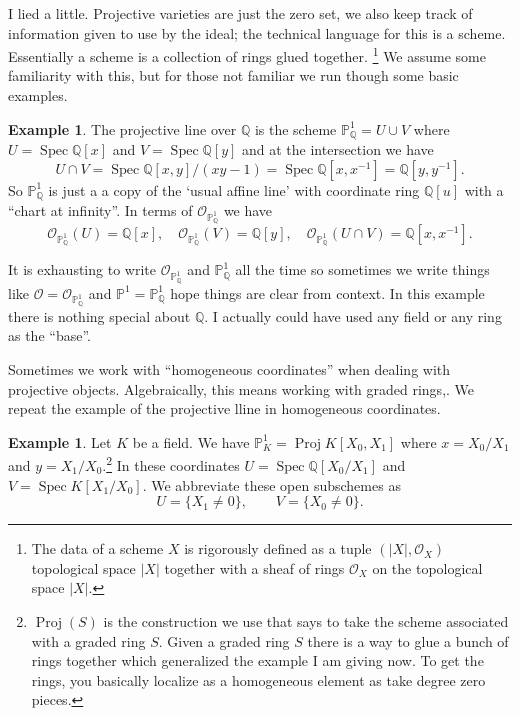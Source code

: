 \documentclass[12pt]{article}
\numberwithin{equation}{section}
\theoremstyle{definition}
\newtheorem{example}[theorem]{Example}
\theoremstyle{remark}
\newcommand{\QQ}{\mathbb{Q}}
\newcommand{\Ocal}{\mathcal{O}}
\newcommand{\PP}{\mathbb{P}}
\newcommand{\Spec}{\operatorname{Spec}}
\newcommand{\Proj}{\operatorname{Proj}}
\begin{document}
I lied a little. Projective varieties are just the zero set, we also keep track of information given to use by the ideal; the technical language for this is a scheme. 
Essentially a scheme is a collection of rings glued together.
\footnote{The data of a scheme $X$ is rigorously defined as a tuple $(\vert X \vert, \Ocal_X)$ topological space $\vert X\vert$ together with a sheaf of rings $\Ocal_X$ on the topological space $\vert X \vert$.}
We assume some familiarity with this, but for those not familiar we run though some basic examples.

\begin{example}
	The projective line over $\QQ$ is the scheme
	$\PP^1_{\QQ}=U \cup V$ where $U = \Spec \QQ[x]$ and $V = \Spec \QQ[y]$ and at the intersection we have 
	$$ U\cap V = \Spec \QQ[x,y]/(xy-1) = \Spec \QQ[x,x^{-1}] = \QQ[y,y^{-1}].$$
	So $\PP^1_{\QQ}$ is just a a copy of the `usual affine line' with coordinate ring $\QQ[u]$
	with a ``chart at infinity''.
	In terms of $\Ocal_{\PP^1_{\QQ}}$ we have 
	$$\Ocal_{\PP^1_{\QQ}}(U) =\QQ[x], \quad \Ocal_{\PP^1_{\QQ}}(V) = \QQ[y], \quad \Ocal_{\PP^1_{\QQ}}(U\cap V) = \QQ[x,x^{-1}].$$
\end{example}
	It is exhausting to write $\Ocal_{\PP^1_{\QQ}}$ and $\PP^1_{\QQ}$ all the time so sometimes we write things like $\Ocal = \Ocal_{\PP^1_{\QQ}}$ and $\PP^1=\PP^1_{\QQ}$ hope things are clear from context. 
	In this example there is nothing special about $\QQ$. 
	I actually could have used any field or any ring as the ``base''.
	
	Sometimes we work with ``homogeneous coordinates'' when dealing with projective objects. 
	Algebraically, this means working with graded rings,.  
	We repeat the example of the projective lline in homogeneous coordinates.
\begin{example}
	Let $K$ be a field. 
	We have $\PP^1_K = \Proj K[X_0,X_1]$ where $x = X_0/X_1$ and $y = X_1/X_0$.\footnote{$\Proj(S)$ is the construction we use that says to take the scheme associated with a graded ring $S$. Given a graded ring $S$ there is a way to glue a bunch of rings together which generalized the example I am giving now. To get the rings, you basically localize as a homogeneous element as take degree zero pieces. }
	In these coordinates $U= \Spec \QQ[X_0/X_1]$ and $V = \Spec K[X_1/X_0]$.
	We abbreviate these open subschemes as 
	 $$ U = \lbrace X_1 \neq 0 \rbrace, \qquad V = \lbrace X_0\neq 0 \rbrace. $$
\end{example}
\end{document}
